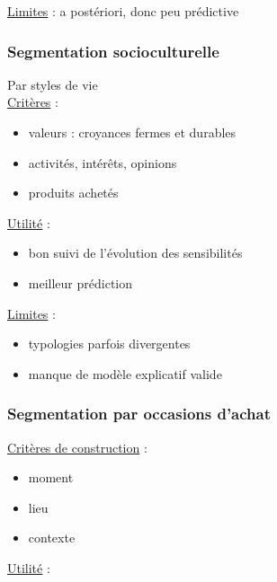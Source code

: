 			\underline{Limites} : a postériori, donc peu prédictive
				
						
				
			\subsubsection{Segmentation socioculturelle}
				
			Par styles de vie \\				
				
			\underline{Critères} : 
				
			\begin{itemize}
				\item valeurs : croyances fermes et durables
				\item activités, intérêts, opinions
				\item produits achetés
			\end{itemize}
				\n
			\underline{Utilité} : 
				
			\begin{itemize}
				\item bon suivi de l'évolution des sensibilités
				\item meilleur prédiction
			\end{itemize}
				\n
			\underline{Limites} :
				
			\begin{itemize}
				\item typologies parfois divergentes
				\item manque de modèle explicatif valide
			\end{itemize}
				
				
				

			\subsubsection{Segmentation par occasions d'achat}				
				
			\underline{Critères de construction} :
			\begin{itemize}
				\item moment
				\item lieu
				\item contexte
			\end{itemize}
				\n
			\underline{Utilité} :
				
